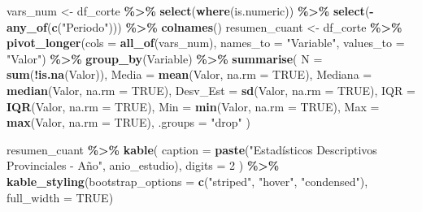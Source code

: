 \documentclass[
]{article}
\newenvironment{Shaded}{\begin{snugshade}}{\end{snugshade}}
\newcommand{\AttributeTok}[1]{\textcolor[rgb]{0.13,0.29,0.53}{#1}}
\newcommand{\ConstantTok}[1]{\textcolor[rgb]{0.56,0.35,0.01}{#1}}
\newcommand{\DecValTok}[1]{\textcolor[rgb]{0.00,0.00,0.81}{#1}}
\newcommand{\FunctionTok}[1]{\textcolor[rgb]{0.13,0.29,0.53}{\textbf{#1}}}
\newcommand{\NormalTok}[1]{#1}
\newcommand{\OtherTok}[1]{\textcolor[rgb]{0.56,0.35,0.01}{#1}}
\newcommand{\SpecialCharTok}[1]{\textcolor[rgb]{0.81,0.36,0.00}{\textbf{#1}}}
\newcommand{\StringTok}[1]{\textcolor[rgb]{0.31,0.60,0.02}{#1}}
\begin{document}
\begin{Shaded}
\begin{Highlighting}[]
\NormalTok{vars\_num }\OtherTok{\textless{}{-}}\NormalTok{ df\_corte }\SpecialCharTok{\%\textgreater{}\%} \FunctionTok{select}\NormalTok{(}\FunctionTok{where}\NormalTok{(is.numeric)) }\SpecialCharTok{\%\textgreater{}\%}
  \FunctionTok{select}\NormalTok{(}\SpecialCharTok{{-}}\FunctionTok{any\_of}\NormalTok{(}\FunctionTok{c}\NormalTok{(}\StringTok{"Periodo"}\NormalTok{))) }\SpecialCharTok{\%\textgreater{}\%}
  \FunctionTok{colnames}\NormalTok{()}
\NormalTok{resumen\_cuant }\OtherTok{\textless{}{-}}\NormalTok{ df\_corte }\SpecialCharTok{\%\textgreater{}\%}
  \FunctionTok{pivot\_longer}\NormalTok{(}\AttributeTok{cols =} \FunctionTok{all\_of}\NormalTok{(vars\_num), }\AttributeTok{names\_to =} \StringTok{"Variable"}\NormalTok{, }\AttributeTok{values\_to =} \StringTok{"Valor"}\NormalTok{) }\SpecialCharTok{\%\textgreater{}\%}
  \FunctionTok{group\_by}\NormalTok{(Variable) }\SpecialCharTok{\%\textgreater{}\%}
  \FunctionTok{summarise}\NormalTok{(}
    \AttributeTok{N =} \FunctionTok{sum}\NormalTok{(}\SpecialCharTok{!}\FunctionTok{is.na}\NormalTok{(Valor)),}
    \AttributeTok{Media =} \FunctionTok{mean}\NormalTok{(Valor, }\AttributeTok{na.rm =} \ConstantTok{TRUE}\NormalTok{),}
    \AttributeTok{Mediana =} \FunctionTok{median}\NormalTok{(Valor, }\AttributeTok{na.rm =} \ConstantTok{TRUE}\NormalTok{),}
    \AttributeTok{Desv\_Est =} \FunctionTok{sd}\NormalTok{(Valor, }\AttributeTok{na.rm =} \ConstantTok{TRUE}\NormalTok{),}
    \AttributeTok{IQR =} \FunctionTok{IQR}\NormalTok{(Valor, }\AttributeTok{na.rm =} \ConstantTok{TRUE}\NormalTok{),}
    \AttributeTok{Min =} \FunctionTok{min}\NormalTok{(Valor, }\AttributeTok{na.rm =} \ConstantTok{TRUE}\NormalTok{),}
    \AttributeTok{Max =} \FunctionTok{max}\NormalTok{(Valor, }\AttributeTok{na.rm =} \ConstantTok{TRUE}\NormalTok{),}
    \AttributeTok{.groups =} \StringTok{"drop"}
\NormalTok{  )}

\NormalTok{resumen\_cuant }\SpecialCharTok{\%\textgreater{}\%}
  \FunctionTok{kable}\NormalTok{(}
    \AttributeTok{caption =} \FunctionTok{paste}\NormalTok{(}\StringTok{"Estadísticos Descriptivos Provinciales {-} Año"}\NormalTok{, anio\_estudio),}
    \AttributeTok{digits =} \DecValTok{2}
\NormalTok{  ) }\SpecialCharTok{\%\textgreater{}\%}
  \FunctionTok{kable\_styling}\NormalTok{(}\AttributeTok{bootstrap\_options =} \FunctionTok{c}\NormalTok{(}\StringTok{"striped"}\NormalTok{, }\StringTok{"hover"}\NormalTok{, }\StringTok{"condensed"}\NormalTok{), }\AttributeTok{full\_width =} \ConstantTok{TRUE}\NormalTok{)}
\end{Highlighting}
\end{Shaded}
\end{document}

